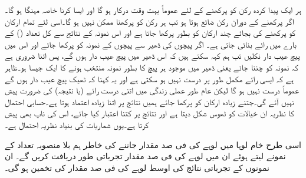ہر ایک پیدا کردہ رکن کو پرکھنے کے لئے عموماً بہت وقت درکار  ہو  گا اور ایسا کرنا خاصہ مہنگا ہو گا۔اگر پرکھنے کے دوران رکن ضائع ہوتا ہو تب ہر رکن کو پرکھنا ممکن نہیں ہو گا۔اسی لئے تمام ارکان کو پرکھنے کی بجائے چند ارکان کو بطور  پرکھا جاتا ہے اور اس نمونہ کے نتائج سے کل تعداد () کے بارے میں رائے بنائی جاتی ہے۔ اگر  پیچوں کی ڈھیر  سے  پیچوں کے نمونہ کو پرکھا جائے اور اس میں  پیچ عیب دار نکلیں تب ہم کہہ سکتے ہیں کہ اس ڈھیر میں  پیچ عیب دار ہوں گے، پس اتنا ضروری ہے کہ نمونہ کو   چننا جائے یعنی ڈھیر میں موجود ہر پیچ کا بطور نمونہ منتخب ہونے کا  ایک جیسا ہو۔ظاہر ہے کہ ایسی رائے مکمل طور پر درست نہیں ہو سکتی ہے اور یہ کہنا کہ ٹھیک  پیچ عیب دار ہوں گے عموماً  درست نہیں ہو گا لیکن عام طور عملی زندگی میں اتنی درست رائے (یا نتیجہ)  کی ضرورت پیش نہیں آئے گی۔جتنے زیادہ ارکان کو پرکھا جائے ہمیں نتائج پر اتنا زیادہ اعتماد ہوتا ہے۔حسابی احتمال کا نظریہ ان خیالات کو ٹھوس شکل دیتا ہے اور نتائج پر کتنا اعتبار کیا جائے، اس کی ناپ بھی پیش کرتا ہے۔یوں شماریات کی بنیاد  نظریہ احتمال ہے۔

اسی طرح خام لوہا میں لوہے کی فی صد مقدار  جاننے کی خاطر ہم  بلا منصوبہ   تعداد کے  نمونے لیتے ہوئے ان میں لوہے کی فی صد مقدار تجرباتی طور دریافت  کریں گے۔  ان   نمونوں کے تجرباتی نتائج  کی اوسط  لوہے کی فی صد مقدار  کی تخمین ہو گی۔

